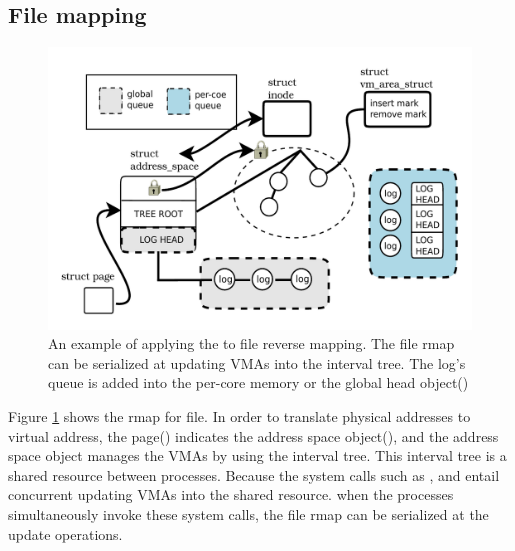 \subsection{File mapping}

\begin{figure}[tb]
  \begin{center}
     \includegraphics[width=1\textwidth,height=1\textheight,keepaspectratio]{fig/file_rmap}
  \end{center}
  \caption{An example of applying the \LDU to file reverse mapping. 
  The file rmap can be serialized at updating VMAs into the interval tree.
  The log's queue is added into the per-core memory or the
  global head object()}
  \label{fig:fileramp}
\end{figure}

Figure \ref{fig:fileramp} shows the rmap for file.
In order to translate physical addresses to virtual address, the page()
indicates the address space object(), and
the address space object manages the VMAs by using the
interval tree.
This interval tree is a shared resource between processes.
Because the system calls such as ,  and
 entail concurrent updating VMAs into the shared resource.
when the processes simultaneously invoke these system calls, the
file rmap can be serialized at the update operations.

